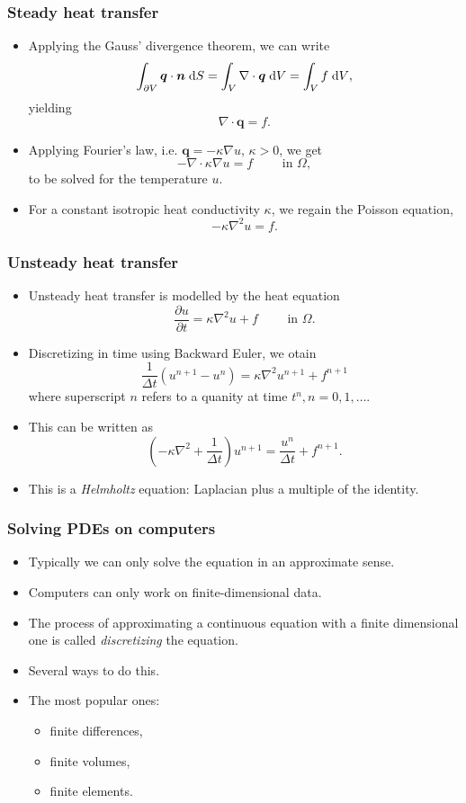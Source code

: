 \begin{frame}[fragile]
  \frametitle{Steady heat transfer}
  \begin{itemize}
  \item Applying the Gauss' divergence theorem, we can write
    \[
      \int_{\partial V} \bm q \cdot \bm n {\;\text{d}S}
      = \int_V \nabla \cdot \bm q {\;\text{d}V}
      = \int_V f {\;\text{d}V},
    \]
    yielding
    \[
      \nabla \cdot \bm q = f.
    \]
  \item Applying Fourier's law, i.e. $\bm q = -\kappa \nabla u$, $\kappa > 0$,
    we get
    \[
      - \nabla\cdot\kappa\nabla u = f \qquad \text{ in } \Omega,
    \]
    to be solved for the temperature $u$.
  \item For a constant isotropic heat conductivity $\kappa$, we regain the
    Poisson equation,
    \[
      - \kappa\nabla^2 u = f.
    \]
  \end{itemize}
\end{frame}

\begin{frame}
  \frametitle{Unsteady heat transfer}
  \begin{itemize}
  \item Unsteady heat transfer is modelled by the heat equation
    \[
      \frac{\partial u}{\partial t} = \kappa\nabla^2u + f \qquad \text{ in } \Omega.
    \]
  \item Discretizing in time using Backward Euler, we otain
    \[
      \frac{1}{\Delta t} (u^{n+1}-u^n) = \kappa\nabla^2u^{n+1}+f^{n+1}
    \]
    where superscript $n$ refers to a quanity at time $t^n, n=0,1,\ldots$.
  \item This can be written as
    \[
      \left(-\kappa\nabla^2 + \frac{1}{\Delta t}\right)u^{n+1} = \frac{u^n}{\Delta t}+f^{n+1}.
    \]
  \item This is a \emph{Helmholtz} equation: Laplacian plus a multiple of the
    identity.
  \end{itemize}
\end{frame}

\begin{frame}[fragile]
  \frametitle{Solving PDEs on computers}
  \begin{itemize}
  \item Typically we can only solve the equation in an approximate sense.
  \item Computers can only work on finite-dimensional data.
  \item The process of approximating a continuous equation with a finite
    dimensional one is called \emph{discretizing} the equation.
  \item Several ways to do this.
  \item The most popular ones:
    \begin{itemize}
    \item finite differences,
    \item finite volumes,
    \item finite elements.
    \end{itemize}
  \end{itemize}
\end{frame}

